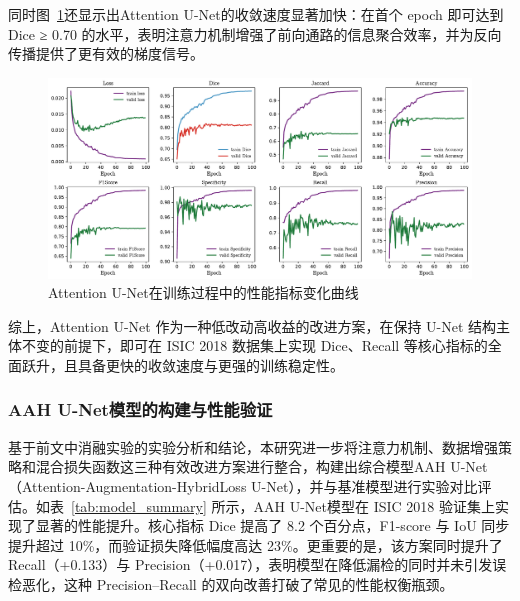 同时图~\ref{fig:attunet}还显示出Attention U-Net的收敛速度显著加快：在首个 epoch 即可达到 Dice ≥ 0.70 的水平，表明注意力机制增强了前向通路的信息聚合效率，并为反向传播提供了更有效的梯度信号。


\begin{figure}[!htbp]
    \centering
    \includegraphics[width=\textwidth]{fig/attunet_metrics.pdf}
    \caption{Attention U-Net在训练过程中的性能指标变化曲线}
    \label{fig:attunet}
\end{figure}

综上，Attention U-Net 作为一种低改动高收益的改进方案，在保持 U-Net 结构主体不变的前提下，即可在 ISIC 2018 数据集上实现 Dice、Recall 等核心指标的全面跃升，且具备更快的收敛速度与更强的训练稳定性。

\subsubsection{AAH U-Net模型的构建与性能验证}

基于前文中消融实验的实验分析和结论，本研究进一步将注意力机制、数据增强策略和混合损失函数这三种有效改进方案进行整合，构建出综合模型AAH U-Net（Attention-Augmentation-HybridLoss U-Net），并与基准模型进行实验对比评估。如表~\ref{tab:model_summary} 所示，AAH U-Net模型在 ISIC 2018 验证集上实现了显著的性能提升。核心指标 Dice 提高了 8.2 个百分点，F1-score 与 IoU 同步提升超过 10\%，而验证损失降低幅度高达 23\%。更重要的是，该方案同时提升了 Recall（+0.133）与 Precision（+0.017），表明模型在降低漏检的同时并未引发误检恶化，这种 Precision–Recall 的双向改善打破了常见的性能权衡瓶颈。

